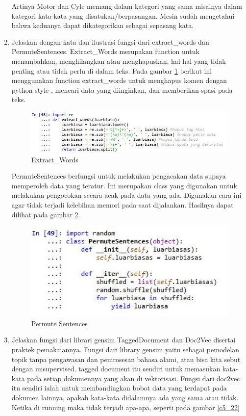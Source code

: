 \begin{enumerate}
\subitem Artinya Motor dan Cyle memang dalam kategori yang sama misalnya dalam kategori kata-kata yang disatukan/berpasangan. Mesin sudah mengetahui bahwa keduanya dapat dikategorikan sebagai sepasang kata.
\item Jelaskan dengan kata dan ilustrasi fungsi dari extract\_words dan PermuteSentences.
\subitem Extract\_Words merupakan function untuk menambahkan, menghilangkan atau menghapuskan, hal hal yang tidak penting atau tidak perlu di dalam teks. Pada gambar \ref{c5_20} berikut ini menggunakan function extract\_words untuk menghapus komen dengan python style , mencari data yang diinginkan, dan memberikan spasi pada teks.
\begin{figure}[!htbp]
	\centerline{\includegraphics[width=1\textwidth]{figures/huda/chapter5/20.JPG}}
	\caption{Extract\_Words}
	\label{c5_20}
\end{figure}
\subitem PermuteSentences berfungsi untuk melakukan pengacakan data supaya memperoleh data yang teratur. Ini merupakan class yang digunakan untuk melakukan pengocokan secara acak pada data yang ada. Digunakan cara ini agar tidak terjadi kelebihan memori pada saat dijalankan. Hasilnya dapat dilihat pada gambar \ref{c5_21}.
\begin{figure}[!htbp]
	\centerline{\includegraphics[width=1\textwidth]{figures/huda/chapter5/21.JPG}}
	\caption{Permute Sentences}
	\label{c5_21}
\end{figure}
\item Jelaskan fungsi dari librari gensim TaggedDocument dan Doc2Vec disertai praktek pemakaiannya.
\subitem Fungsi dari library gensim yaitu sebagai pemodelan topik tanpa pengawasan dan pemrosesan bahasa alami, atau bisa kita sebut dengan unsupervised.  tagged document itu sendiri untuk memasukan kata-kata pada setiap dokumennya yang akan di vektorisasi. Fungsi dari doc2vec itu sendiri ialah untuk membandingkan bobot data yang terdapat pada dokumen lainnya, apakah kata-kata didalamnya ada yang sama atau tidak. Ketika di running maka tidak terjadi apa-apa, seperti pada gambar \ref{c5_22}

\end{enumerate}
